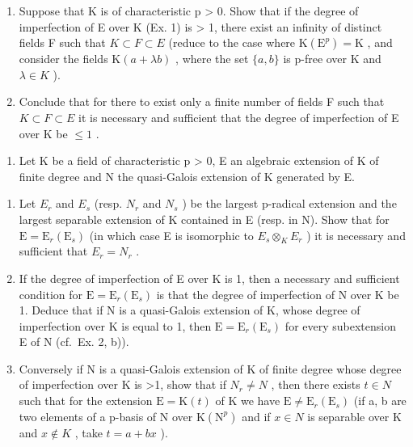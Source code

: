 \begin{enumerate}
\def\labelenumi{\alph{enumi})}
\item
  Suppose that K is of characteristic p \textgreater{} 0. Show that if the degree of imperfection of E over K (Ex. 1) is \textgreater{} 1, there exist an infinity of distinct fields F such that \(K \subset F \subset E\) (reduce to the case where \(\mathrm{K}(\mathrm{E}^{p}) = \mathrm{K}\) , and consider the fields \(\mathrm{K}(a + \lambda b)\) , where the set \(\{a, b\}\) is p-free over K and \(\lambda \in K\) ).
\item
  Conclude that for there to exist only a finite number of fields F such that \(K \subset F \subset E\) it is necessary and sufficient that the degree of imperfection of E over K be \(\leqslant 1\) .
\end{enumerate}

\begin{enumerate}
\def\labelenumi{\arabic{enumi})}
\setcounter{enumi}{5}
\tightlist
\item
  Let K be a field of characteristic p \textgreater{} 0, E an algebraic extension of K of finite degree and N the quasi-Galois extension of K generated by E.
\end{enumerate}

\begin{enumerate}
\def\labelenumi{\alph{enumi})}
\item
  Let \(E_{r}\) and \(E_{s}\) (resp. \(N_{r}\) and \(N_{s}\) ) be the largest p-radical extension and the largest separable extension of K contained in E (resp. in N). Show that for \(\mathrm{E} = \mathrm{E}_{r}(\mathrm{E}_{s})\) (in which case E is isomorphic to \(E_{s} \otimes_{K} E_{r}\) ) it is necessary and sufficient that \(E_{r} = N_{r}\) .
\item
  If the degree of imperfection of E over K is 1, then a necessary and sufficient condition for \(\mathrm{E} = \mathrm{E}_{r}(\mathrm{E}_{s})\) is that the degree of imperfection of N over K be 1. Deduce that if N is a quasi-Galois extension of K, whose degree of imperfection over K is equal to 1, then \(\mathrm{E} = \mathrm{E}_{r}(\mathrm{E}_{s})\) for every subextension E of N (cf.~Ex. 2, b)).
\item
  Conversely if N is a quasi-Galois extension of K of finite degree whose degree of imperfection over K is \textgreater1, show that if \(N_{r} \neq N\) , then there exists \(t \in N\) such that for the extension \(\mathrm{E} = \mathrm{K}(t)\) of K we have \(\mathrm{E} \neq \mathrm{E}_{r}(\mathrm{E}_{s})\) (if a, b are two elements of a p-basis of N over \(\mathrm{K}(\mathrm{N}^{p})\) and if \(x \in N\) is separable over K and \(x \notin K\) , take \(t = a + bx\) ).
\end{enumerate}

